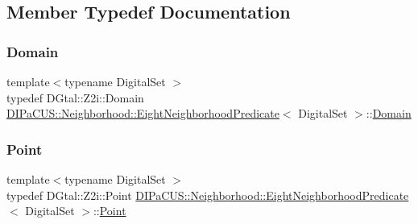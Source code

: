 \subsection{Member Typedef Documentation}
\mbox{\label{classDIPaCUS_1_1Neighborhood_1_1EightNeighborhoodPredicate_accd4ba38b8e605d949206135f0a3de61}} 
\subsubsection{\texorpdfstring{Domain}{Domain}}
{\footnotesize\ttfamily template$<$typename Digital\+Set $>$ \\
typedef D\+Gtal\+::\+Z2i\+::\+Domain \mbox{\hyperlink{classDIPaCUS_1_1Neighborhood_1_1EightNeighborhoodPredicate}{D\+I\+Pa\+C\+U\+S\+::\+Neighborhood\+::\+Eight\+Neighborhood\+Predicate}}$<$ Digital\+Set $>$\+::\mbox{\hyperlink{classDIPaCUS_1_1Neighborhood_1_1EightNeighborhoodPredicate_accd4ba38b8e605d949206135f0a3de61}{Domain}}}

\mbox{\label{classDIPaCUS_1_1Neighborhood_1_1EightNeighborhoodPredicate_afd5b888b29042dd8ea3da17b3c3ee8cb}} 
\subsubsection{\texorpdfstring{Point}{Point}}
{\footnotesize\ttfamily template$<$typename Digital\+Set $>$ \\
typedef D\+Gtal\+::\+Z2i\+::\+Point \mbox{\hyperlink{classDIPaCUS_1_1Neighborhood_1_1EightNeighborhoodPredicate}{D\+I\+Pa\+C\+U\+S\+::\+Neighborhood\+::\+Eight\+Neighborhood\+Predicate}}$<$ Digital\+Set $>$\+::\mbox{\hyperlink{classDIPaCUS_1_1Neighborhood_1_1EightNeighborhoodPredicate_afd5b888b29042dd8ea3da17b3c3ee8cb}{Point}}}



